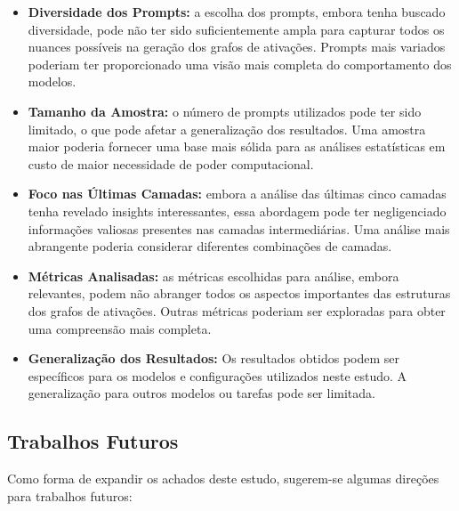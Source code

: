 \begin{itemize}
    \item \textbf{Diversidade dos Prompts:} a escolha dos prompts, embora tenha buscado diversidade, pode não ter sido suficientemente ampla para capturar todos os nuances possíveis na geração dos grafos de ativações. Prompts mais variados poderiam ter proporcionado uma visão mais completa do comportamento dos modelos.
    \item \textbf{Tamanho da Amostra:} o número de prompts utilizados pode ter sido limitado, o que pode afetar a generalização dos resultados. Uma amostra maior poderia fornecer uma base mais sólida para as análises estatísticas em custo de maior necessidade de poder computacional.
    \item \textbf{Foco nas Últimas Camadas:} embora a análise das últimas cinco camadas tenha revelado insights interessantes, essa abordagem pode ter negligenciado informações valiosas presentes nas camadas intermediárias. Uma análise mais abrangente poderia considerar diferentes combinações de camadas.
    \item \textbf{Métricas Analisadas:} as métricas escolhidas para análise, embora relevantes, podem não abranger todos os aspectos importantes das estruturas dos grafos de ativações. Outras métricas poderiam ser exploradas para obter uma compreensão mais completa.
    \item \textbf{Generalização dos Resultados:} Os resultados obtidos podem ser específicos para os modelos e configurações utilizados neste estudo. A generalização para outros modelos ou tarefas pode ser limitada.
\end{itemize}

\subsection{Trabalhos Futuros}

Como forma de expandir os achados deste estudo, sugerem-se algumas direções para trabalhos futuros:

